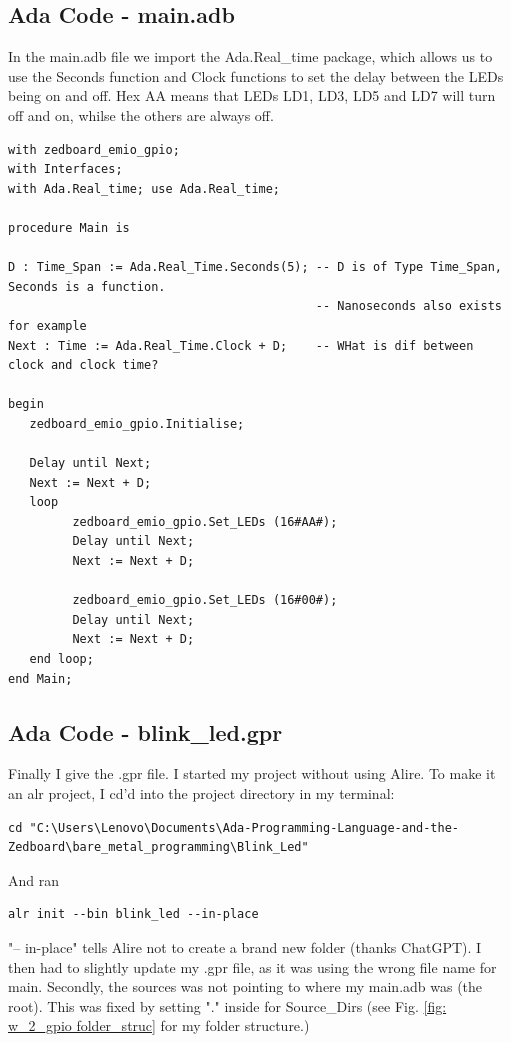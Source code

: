 \subsection{Ada Code - main.adb}

In the main.adb file we import the Ada.Real\_time package, which allows us to use the Seconds function and Clock functions to set the delay between the LEDs being on and off. Hex AA means that LEDs LD1, LD3, LD5 and LD7 will turn off and on, whilse the others are always off.

\begin{lstlisting}[style=ada]
with zedboard_emio_gpio;
with Interfaces;
with Ada.Real_time; use Ada.Real_time;

procedure Main is

D : Time_Span := Ada.Real_Time.Seconds(5); -- D is of Type Time_Span, Seconds is a function.
                                           -- Nanoseconds also exists for example
Next : Time := Ada.Real_Time.Clock + D;    -- WHat is dif between clock and clock time?

begin
   zedboard_emio_gpio.Initialise;

   Delay until Next;
   Next := Next + D;
   loop
         zedboard_emio_gpio.Set_LEDs (16#AA#);
         Delay until Next;
         Next := Next + D;

         zedboard_emio_gpio.Set_LEDs (16#00#);
         Delay until Next;
         Next := Next + D;              
   end loop;
end Main;
\end{lstlisting}

\subsection{Ada Code - blink\_led.gpr}

Finally I give the .gpr file. I started my project without using Alire. To make it an alr project, I cd'd into the project directory in my terminal:

\begin{lstlisting}[style=xdc]
   cd "C:\Users\Lenovo\Documents\Ada-Programming-Language-and-the-Zedboard\bare_metal_programming\Blink_Led"
\end{lstlisting}

And ran

\begin{lstlisting}[style=xdc]
   alr init --bin blink_led --in-place
\end{lstlisting}
    
"-- in-place" tells Alire not to create a brand new folder (thanks ChatGPT). I then had to slightly update my .gpr file, as it was using the wrong file name for main. Secondly, the sources was not pointing to where my main.adb was (the root). This was fixed by setting "." inside for Source\_Dirs (see Fig. \ref{fig: w_2_gpio folder_struc} for my folder structure.)

